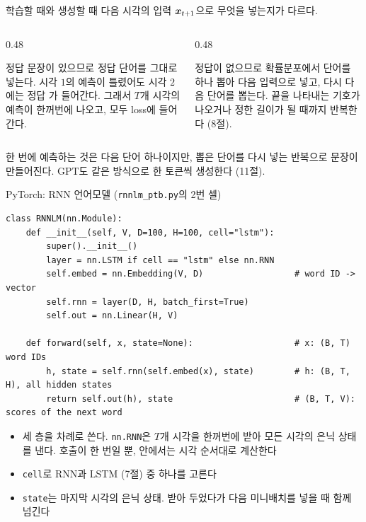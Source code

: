 \documentclass[aspectratio=169,11pt]{beamer}
\begin{document}
\begin{frame}{학습할 때와 생성할 때}
다음 시각의 입력 $\bm{x}_{t+1}$으로 무엇을 넣는지가 다르다.
\vskip2mm
\begin{columns}[T,onlytextwidth]
\begin{column}{0.48\textwidth}
\begin{keybox}
정답 문장이 있으므로 정답 단어를 그대로 넣는다.
시각 $1$의 예측이 틀렸어도 시각 $2$에는 정답 가 들어간다.
그래서 $T$개 시각의 예측이 한꺼번에 나오고, 모두 loss에 들어간다.
\end{keybox}
\end{column}
\begin{column}{0.48\textwidth}
\begin{keybox}[생성]
정답이 없으므로 확률분포에서 단어를 하나 뽑아 다음 입력으로 넣고, 다시 다음 단어를 뽑는다.
끝을 나타내는 기호가 나오거나 정한 길이가 될 때까지 반복한다 (8절).
\end{keybox}
\end{column}
\end{columns}
\vskip3mm
한 번에 예측하는 것은 다음 단어 하나이지만, 뽑은 단어를 다시 넣는 반복으로 문장이 만들어진다.
GPT도 같은 방식으로 한 토큰씩 생성한다 (11절).
\end{frame}

\begin{frame}[fragile]{PyTorch: RNN 언어모델 (\texttt{rnnlm\_ptb.py}의 2번 셀)}
\begin{lstlisting}
class RNNLM(nn.Module):
    def __init__(self, V, D=100, H=100, cell="lstm"):
        super().__init__()
        layer = nn.LSTM if cell == "lstm" else nn.RNN
        self.embed = nn.Embedding(V, D)                  # word ID -> vector
        self.rnn = layer(D, H, batch_first=True)
        self.out = nn.Linear(H, V)

    def forward(self, x, state=None):                    # x: (B, T) word IDs
        h, state = self.rnn(self.embed(x), state)        # h: (B, T, H), all hidden states
        return self.out(h), state                        # (B, T, V): scores of the next word
\end{lstlisting}
\begin{itemize}
\item 세 층을 차례로 쓴다. \texttt{nn.RNN}은 $T$개 시각을 한꺼번에 받아 모든 시각의 은닉 상태를 낸다.
호출이 한 번일 뿐, 안에서는 시각 순서대로 계산한다
\item \texttt{cell}로 RNN과 LSTM (7절) 중 하나를 고른다
\item \texttt{state}는 마지막 시각의 은닉 상태. 받아 두었다가 다음 미니배치를 넣을 때 함께 넘긴다
\end{itemize}
\end{frame}
\end{document}
